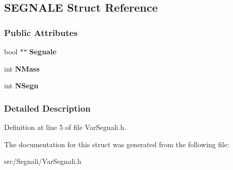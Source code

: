 \hypertarget{structSEGNALE}{}\subsection{S\+E\+G\+N\+A\+LE Struct Reference}
\label{structSEGNALE}
\subsubsection*{Public Attributes}
\begin{DoxyCompactItemize}
\item 
bool $\ast$$\ast$ {\bfseries Segnale}\hypertarget{structSEGNALE_ac7d273b48195877cf3f9b7f9de912df9}{}\label{structSEGNALE_ac7d273b48195877cf3f9b7f9de912df9}

\item 
int {\bfseries N\+Mass}\hypertarget{structSEGNALE_aeb62e1458ef62b80a349f89b4d04d023}{}\label{structSEGNALE_aeb62e1458ef62b80a349f89b4d04d023}

\item 
int {\bfseries N\+Segn}\hypertarget{structSEGNALE_ae17dca7f5e2139ba2ef487859c3f316e}{}\label{structSEGNALE_ae17dca7f5e2139ba2ef487859c3f316e}

\end{DoxyCompactItemize}


\subsubsection{Detailed Description}


Definition at line 5 of file Var\+Segnali.\+h.



The documentation for this struct was generated from the following file\+:\begin{DoxyCompactItemize}
\item 
src/\+Segnali/Var\+Segnali.\+h\end{DoxyCompactItemize}
